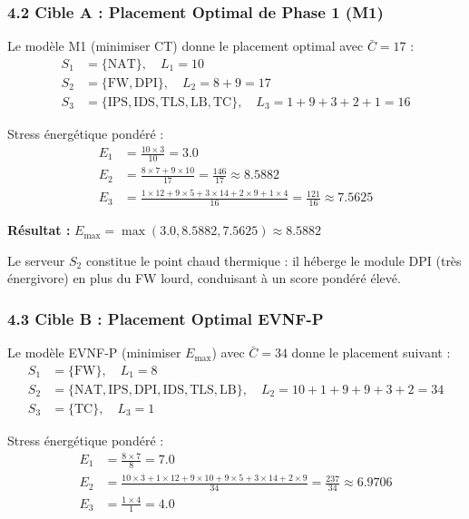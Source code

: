 \documentclass{article}
\begin{document}
\subsubsection{4.2 Cible A : Placement Optimal de Phase 1 (M1)}

Le modèle M1 (minimiser CT) donne le placement optimal avec $\bar{C} = 17$ :
\begin{align*}
S_1 &= \{\text{NAT}\}, \quad L_1 = 10 \\
S_2 &= \{\text{FW}, \text{DPI}\}, \quad L_2 = 8 + 9 = 17 \\
S_3 &= \{\text{IPS}, \text{IDS}, \text{TLS}, \text{LB}, \text{TC}\}, \quad L_3 = 1 + 9 + 3 + 2 + 1 = 16
\end{align*}

Stress énergétique pondéré :
\begin{align*}
E_1 &= \frac{10 \times 3}{10} = 3.0 \\
E_2 &= \frac{8 \times 7 + 9 \times 10}{17} = \frac{146}{17} \approx 8.5882 \\
E_3 &= \frac{1 \times 12 + 9 \times 5 + 3 \times 14 + 2 \times 9 + 1 \times 4}{16} = \frac{121}{16} \approx 7.5625
\end{align*}

\textbf{Résultat :} $E_{\max} = \max(3.0, 8.5882, 7.5625) \approx \boxed{8.5882}$

Le serveur $S_2$ constitue le point chaud thermique : il héberge le module DPI (très énergivore) en plus du FW lourd, conduisant à un score pondéré élevé.

\subsubsection{4.3 Cible B : Placement Optimal EVNF-P}

Le modèle EVNF-P (minimiser $E_{\max}$) avec $\bar{C} = 34$ donne le placement suivant :
\begin{align*}
S_1 &= \{\text{FW}\}, \quad L_1 = 8 \\
S_2 &= \{\text{NAT}, \text{IPS}, \text{DPI}, \text{IDS}, \text{TLS}, \text{LB}\}, \quad L_2 = 10 + 1 + 9 + 9 + 3 + 2 = 34 \\
S_3 &= \{\text{TC}\}, \quad L_3 = 1
\end{align*}

Stress énergétique pondéré :
\begin{align*}
E_1 &= \frac{8 \times 7}{8} = 7.0 \\
E_2 &= \frac{10 \times 3 + 1 \times 12 + 9 \times 10 + 9 \times 5 + 3 \times 14 + 2 \times 9}{34} = \frac{237}{34} \approx 6.9706 \\
E_3 &= \frac{1 \times 4}{1} = 4.0
\end{align*}
\end{document}
